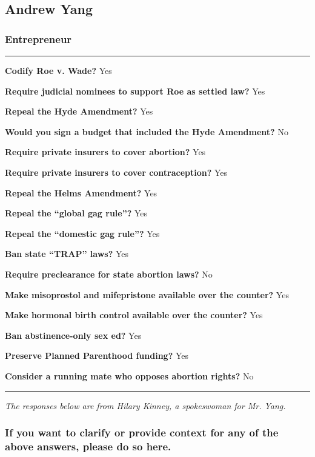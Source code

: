 \hypertarget{andrew-yang}{%
\subsection{Andrew Yang}\label{andrew-yang}}

\hypertarget{entrepreneur}{%
\subsubsection{Entrepreneur}\label{entrepreneur}}

\begin{center}\rule{0.5\linewidth}{\linethickness}\end{center}

\textbf{Codify Roe v. Wade?} Yes

\textbf{Require judicial nominees to support Roe as settled law?} Yes

\textbf{Repeal the Hyde Amendment?} Yes

\textbf{Would you sign a budget that included the Hyde Amendment?} No

\textbf{Require private insurers to cover abortion?} Yes

\textbf{Require private insurers to cover contraception?} Yes

\textbf{Repeal the Helms Amendment?} Yes

\textbf{Repeal the ``global gag rule''?} Yes

\textbf{Repeal the ``domestic gag rule''?} Yes

\textbf{Ban state ``TRAP'' laws?} Yes

\textbf{Require preclearance for state abortion laws?} No

\textbf{Make misoprostol and mifepristone available over the counter?}
Yes

\textbf{Make hormonal birth control available over the counter?} Yes

\textbf{Ban abstinence-only sex ed?} Yes

\textbf{Preserve Planned Parenthood funding?} Yes

\textbf{Consider a running mate who opposes abortion rights?} No

\begin{center}\rule{0.5\linewidth}{\linethickness}\end{center}

\emph{The responses below are from Hilary Kinney, a spokeswoman for Mr.
Yang.}

\hypertarget{if-you-want-to-clarify-or-provide-context-for-any-of-the-above-answers-please-do-so-here-9}{%
\subsubsection{If you want to clarify or provide context for any of the
above answers, please do so
here.}\label{if-you-want-to-clarify-or-provide-context-for-any-of-the-above-answers-please-do-so-here-9}}

